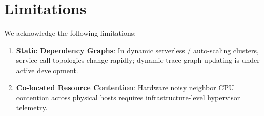 \section{Limitations}
\label{sec:limitations}

We acknowledge the following limitations:
\begin{enumerate}
    \item \textbf{Static Dependency Graphs}: In dynamic serverless / auto-scaling clusters, service call topologies change rapidly; dynamic trace graph updating is under active development.
    \item \textbf{Co-located Resource Contention}: Hardware noisy neighbor CPU contention across physical hosts requires infrastructure-level hypervisor telemetry.
\end{enumerate}
